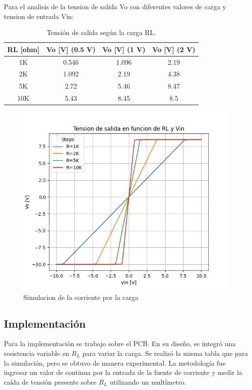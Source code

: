 Para el analisis de la tension de salida Vo con diferentes valores de carga y tension de entrada Vin:

\begin{table}[h!]
\centering
\begin{tabular}{|c|c|c|c|}
\hline
\textbf{RL [ohm]} & \textbf{Vo [V] (0.5 V)} & \textbf{Vo [V] (1 V)} & \textbf{Vo [V] (2 V)} \\ \hline
1K    & 0.546  & 1.096  & 2.19  \\ \hline
2K    & 1.092  & 2.19   & 4.38  \\ \hline
5K    & 2.72   & 5.46   & 8.47  \\ \hline
10K   & 5.43   & 8.45   & 8.5  \\ \hline
\end{tabular}
\caption{Tensión de salida según la carga RL.}
\label{tab:Vo_vs_RL}
\end{table}
\begin{figure}[H]
    \centering
    \includegraphics[width=0.70\linewidth]{Secciones/Circuito2/TP1_2_Vo_vs_Vin_RL.png}
    \caption{Simulacion de la corriente por la carga}
\end{figure}

\subsection{Implementación}

Para la implementación se trabajo sobre el PCB. En su diseño, se integró una resistencia variable en \(R_L\) para variar la carga. Se realizó la misma tabla que para la simulación, pero se obtuvo de manera experimental. La metodología fue ingresar un valor de continua por la entrada de la fuente de corriente y medir la caída de tensión presente sobre \(R_L\) utilizando un multímetro.

